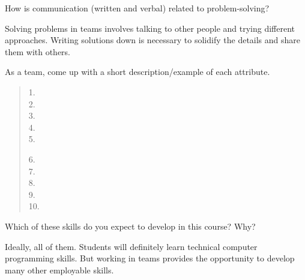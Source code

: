 \Q How is communication (written and verbal) related to problem-solving?

\begin{answer}[3em]
Solving problems in teams involves talking to other people and trying different approaches.
Writing solutions down is necessary to solidify the details and share them with others.
\end{answer}


\Q As a team, come up with a short description/example of each attribute.

\begin{quote}
\begin{multicols}{2}
1.  \\[1ex]
2.  \\[1ex]
3.  \\[1ex]
4.  \\[1ex]
5. 

6.~  \\[1ex]
7.~  \\[1ex]
8.~  \\[1ex]
9.~  \\[1ex]
10. 
\end{multicols}
\end{quote}

\vspace{-1ex}


\Q Which of these skills do you expect to develop in this course? Why?

\begin{answer}[3em]
Ideally, all of them. Students will definitely learn technical computer programming skills.
But working in teams provides the opportunity to develop many other employable skills.
\end{answer}
